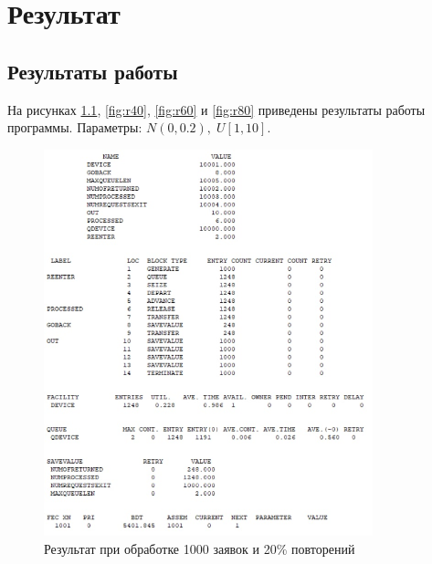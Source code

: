 \chapter{Результат}

%

\section{Результаты работы}
На рисунках \ref{fig:r20}, \ref{fig:r40}, \ref{fig:r60} и \ref{fig:r80} приведены результаты работы программы. Параметры: ${N(0 , 0.2), \; U{[1, 10]}}$.

\begin{figure}[H]
	\centering
	\includegraphics[width=0.85\textwidth]{assets/20.jpg}
	\caption{Результат при обработке 1000 заявок и 20\% повторений}
	\label{fig:r20}
\end{figure}


